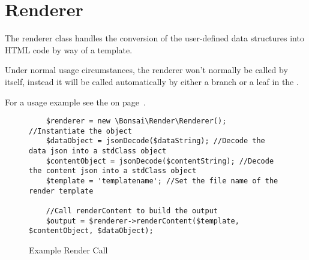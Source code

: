 \documentclass[]{book}
\begin{document}
\begin{figure}[p]
	
	\vspace{12pt}

\end{figure}


\section{Renderer}

The renderer class handles the conversion of the user-defined data structures into HTML code by way of a template.

Under normal usage circumstances, the renderer won't normally be called by itself, instead it will be called automatically by either a branch or a leaf in the .

For a usage example see the  on page~\pageref{ExampleRenderCall}.

\begin{figure}[p]
	\caption{Example Render Call}
	\label{ExampleRenderCall}
	\vspace{12pt}
	\begin{verbatim}
	$renderer = new \Bonsai\Render\Renderer(); //Instantiate the object
    $dataObject = jsonDecode($dataString); //Decode the data json into a stdClass object
    $contentObject = jsonDecode($contentString); //Decode the content json into a stdClass object
    $template = 'templatename'; //Set the file name of the render template
    
    //Call renderContent to build the output
    $output = $renderer->renderContent($template, $contentObject, $dataObject);
	\end{verbatim}
\end{figure}
\end{document}

